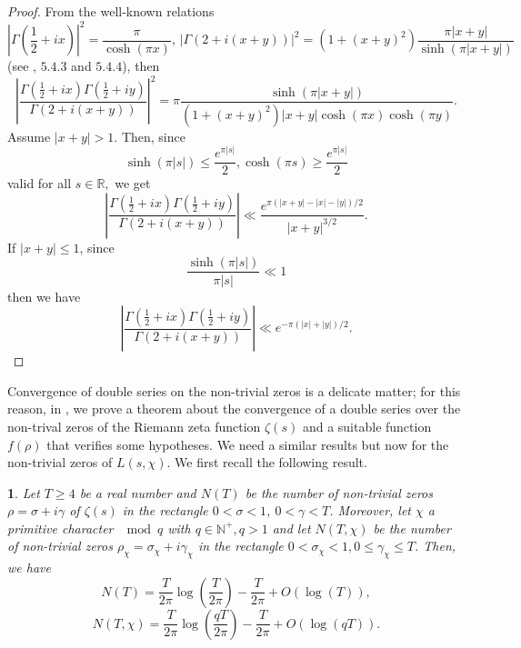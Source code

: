 \documentclass[10pt,a4paper]{amsart}
\numberwithin{equation}{section}
\numberwithin{figure}{section}
\newtheorem{prop}[thm]{\protect\propositionname}
\providecommand{\propositionname}{Proposition}
\begin{document}
\begin{proof}
From the well-known relations
\[
\left|\Gamma\left(\frac{1}{2}+ix\right)\right|^{2}=\frac{\pi}{\cosh\left(\pi x\right)},\,\left|\Gamma\left(2+i(x+y)\right)\right|^{2}=\left(1+\left(x+y\right)^{2}\right)\frac{\pi\left|x+y\right|}{\sinh\left(\pi\left|x+y\right|\right)}
\]
(see \cite{O2010}, $5.4.3$ and $5.4.4$), then
\[
\left|\frac{\Gamma\left(\frac{1}{2}+ix\right)\Gamma\left(\frac{1}{2}+iy\right)}{\Gamma\left(2+i(x+y)\right)}\right|^{2}=\pi\frac{\sinh\left(\pi\left|x+y\right|\right)}{\left(1+\left(x+y\right)^{2}\right)\left|x+y\right|\cosh\left(\pi x\right)\cosh\left(\pi y\right)}.
\]
Assume $\left|x+y\right|>1.$ Then, since
\[
\sinh\left(\pi\left|s\right|\right)\leq\frac{e^{\pi\left|s\right|}}{2},\cosh\left(\pi s\right)\geq\frac{e^{\pi\left|s\right|}}{2}
\]
valid for all $s\in\mathbb{R},$ we get
\[
\left|\frac{\Gamma\left(\frac{1}{2}+ix\right)\Gamma\left(\frac{1}{2}+iy\right)}{\Gamma\left(2+i(x+y)\right)}\right|\ll\frac{e^{\pi\left(\left|x+y\right|-\left|x\right|-\left|y\right|\right)/2}}{\left|x+y\right|^{3/2}}.
\]
If $\left|x+y\right|\leq1$, since
\[
\frac{\sinh\left(\pi\left|s\right|\right)}{\pi\left|s\right|}\ll1
\]
then we have
\[
\left|\frac{\Gamma\left(\frac{1}{2}+ix\right)\Gamma\left(\frac{1}{2}+iy\right)}{\Gamma\left(2+i(x+y)\right)}\right|\ll e^{-\pi\left(\left|x\right|+\left|y\right|\right)/2}.
\]
\end{proof}
%
Convergence of double series on the non-trivial zeros is a delicate
matter; for this reason, in \cite{CGZ2026} , we prove a theorem about
the convergence of a double series over the non-trival zeros of the
Riemann zeta function $\zeta(s)$ and a suitable function $f(\rho)$
that verifies some hypotheses. We need a similar results but now for
the non-trivial zeros of $L\left(s,\chi\right)$. We first recall
the following result.
\begin{prop}
Let $T\geq4$ be a real number and $N\left(T\right)$ be the number
of non-trivial zeros $\rho=\sigma+i\gamma$ of $\zeta\left(s\right)$
in the rectangle $0<\sigma<1$, $0<\gamma<T$. Moreover, let $\chi$
a primitive character $\mod q$ with $q\in\mathbb{N}^{+},q>1$ and
let $N\left(T,\chi\right)$ be the number of non-trivial zeros $\rho_{\chi}=\sigma_{\chi}+i\gamma_{\chi}$
in the rectangle $0<\sigma_{\chi}<1,0\leq\gamma_{\chi}\leq T$. Then,
we have
\begin{equation}
N\left(T\right)=\frac{T}{2\pi}\log\left(\frac{T}{2\pi}\right)-\frac{T}{2\pi}+O\left(\log\left(T\right)\right),\label{eq:N(T)}
\end{equation}
\begin{equation}
N\left(T,\chi\right)=\frac{T}{2\pi}\log\left(\frac{qT}{2\pi}\right)-\frac{T}{2\pi}+O\left(\log\left(qT\right)\right).\label{eq:N(T,=00005Cchi)}
\end{equation}
\end{prop}
\end{document}
